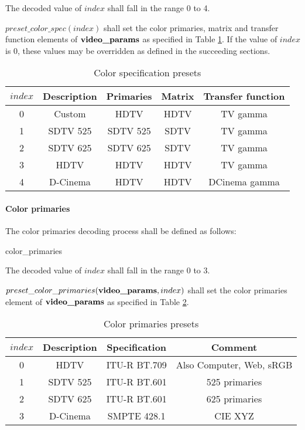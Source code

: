 The decoded value of $index$ shall fall in the range 0 to 4.

$preset\_color\_spec(index)$ shall set the color primaries, matrix and transfer function elements of $\textbf{video\_params}$ as specified 
in Table \ref{table:colorspecvalues}. If the value of $index$ is 0, these values may be overridden as defined in the succeeding sections. 

\begin{table}[!ht]
\centering
\begin{tabular}{|c|c|c|c|c|}
\hline
\rowcolor[gray]{0.75}$index$ & {\bf Description}& {\bf Primaries} & {\bf Matrix}& {\bf Transfer function}\\
\hline
0 & Custom & HDTV & HDTV & TV gamma \\ 
\hline
1 & SDTV 525 & SDTV 525 & SDTV & TV gamma \\
\hline
2 & SDTV 625 & SDTV 625 & SDTV & TV gamma \\
\hline
3 & HDTV & HDTV & HDTV & TV gamma \\
\hline
4 & D-Cinema & HDTV & HDTV & DCinema gamma\\
\hline
\end{tabular}
\caption{Color specification presets}\label{table:colorspecvalues}
\end{table}

\paragraph{Color primaries}
\label{colorprimaries}

The color primaries decoding process shall be defined as follows:

\begin{pseudo}{color\_primaries}{\VideoParams}
\bsEND
\end{pseudo}

The decoded value of $index$ shall fall in the range 0 to 3.

 $preset\_color\_primaries(\textbf{video\_params},index)$ shall set the color primaries 
element of $\textbf{video\_params}$ as specified
in Table \ref{table:primariesvalues}.

\begin{table}[!ht]
\centering
\begin{tabular}{|c|c|c|c|}
\hline
\rowcolor[gray]{0.75}$index$ &  {\bf Description} & {\bf Specification} & {\bf Comment}      \\
\hline
0       &  HDTV & ITU-R BT.709 & Also Computer, Web, sRGB \\ 
\hline
1       &  SDTV 525 & ITU-R BT.601 & 525 primaries          \\
\hline
2       &  SDTV 625 & ITU-R BT.601 & 625 primaries  \\
\hline
3       &  D-Cinema & SMPTE 428.1 & CIE XYZ              \\
\hline
\end{tabular}
\caption{Color primaries presets}\label{table:primariesvalues}
\end{table}

